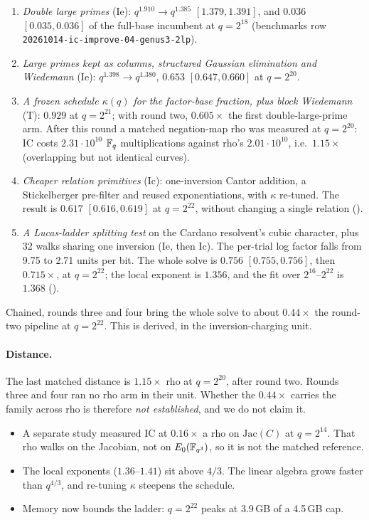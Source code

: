 \begin{enumerate}
\item \emph{Double large primes} (Ie): $q^{1.910}\to q^{1.385}$
  $[1.379,1.391]$, and $0.036$ $[0.035,0.036]$ of the full-base incumbent at
  $q=2^{18}$ (benchmarks row \texttt{20261014-ic-improve-04-genus3-2lp}).
\item \emph{Large primes kept as columns, structured Gaussian elimination
  and Wiedemann} (Ie): $q^{1.398}\to q^{1.380}$, $0.653$ $[0.647,0.660]$ at
  $q=2^{20}$.
\item \emph{A frozen schedule $\kappa(q)$ for the factor-base fraction, plus
  block Wiedemann}~\cite{coppersmith1994} (T): $0.929$ at $q=2^{21}$; with
  round two, $0.605\times$ the first double-large-prime arm. After this
  round a matched negation-map rho was measured at $q=2^{20}$: IC costs
  $2.31\cdot10^{10}$ $\mathbb{F}_q$ multiplications against rho's $2.01\cdot10^{10}$,
  i.e.\ $1.15\times$ (overlapping but not identical curves).
\item \emph{Cheaper relation primitives} (Ic): one-inversion Cantor
  addition, a Stickelberger pre-filter and reused exponentiations, with
  $\kappa$ re-tuned. The result is $0.617$ $[0.616,0.619]$ at $q=2^{22}$,
  without changing a single relation
  ().
\item \emph{A Lucas-ladder splitting test} on the Cardano resolvent's cubic
  character, plus 32 walks sharing one inversion (Ie, then Ic). The
  per-trial log factor falls from 9.75 to 2.71 units per bit. The whole
  solve is $0.756$ $[0.755,0.756]$, then $0.715\times$, at $q=2^{22}$; the
  local exponent is $1.356$, and the fit over $2^{16}$--$2^{22}$ is $1.368$
  ().
\end{enumerate}
Chained, rounds three and four bring the whole solve to about $0.44\times$
the round-two pipeline at $q=2^{22}$. This is derived, in the
inversion-charging unit.

\paragraph{Distance.} The last matched distance is $1.15\times$ rho at
$q=2^{20}$, after round two. Rounds three and four ran no rho arm in their
unit. Whether the $0.44\times$ carries the family across rho is therefore
\emph{not established}, and we do not claim it.
\begin{itemize}
\item A separate study measured IC at $0.16\times$ a rho on
  $\mathrm{Jac}(C)$ at $q=2^{14}$. That rho walks on the Jacobian, not on
  $E_0(\mathbb{F}_{q^3})$, so it is not the matched reference.
\item The local exponents ($1.36$--$1.41$) sit above $4/3$. The linear
  algebra grows faster than $q^{4/3}$, and re-tuning $\kappa$ steepens the
  schedule.
\item Memory now bounds the ladder: $q=2^{22}$ peaks at 3.9\,GB of a
  4.5\,GB cap.
\end{itemize}

